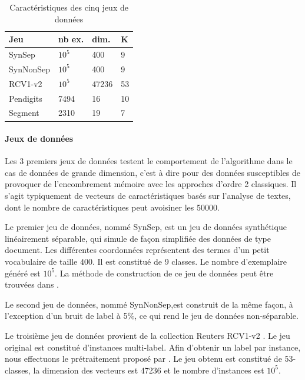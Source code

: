 \documentclass[twocolumn]{article}
\begin{document}
\begin{table}[h]
	\caption{Caractéristiques des cinq jeux de données}
	\label{table:mce}
	\begin{center}
		\begin{tabular}{l l l l}
			{\bf Jeu}  & {\bf nb ex.} & {\bf dim.} & {\bf K}\\
			\hline
			SynSep & $10^5$ 	& 400 	& 9 \\
			
			SynNonSep & $10^5$ & 400 	& 9 \\
			
			RCV1-v2  & $10^5$ 	& 47236 	& 53 \\
			
			Pendigits 	& 7494	& 16	& 10	\\
			
			Segment & 2310	& 19	& 7	\\
		\end{tabular}
	\end{center}
\end{table}

\paragraph{Jeux de données}
Les 3 premiers jeux de données testent le comportement de l'algorithme dans le cas de données de grande dimension, c'est à dire pour des données susceptibles de provoquer de l'encombrement mémoire avec les approches d'ordre 2 classiques. Il s'agit typiquement de vecteurs de caractéristiques basés sur l'analyse de textes, dont le nombre de caractéristiques peut avoisiner les 50000.
 
Le premier jeu de données, nommé SynSep, est un jeu de données synthétique linéairement séparable, qui simule de façon simplifiée des données de type document.  Les différentes coordonnées représentent des termes d'un petit vocabulaire de taille $400$. Il est constitué de 9 classes. Le nombre d'exemplaire généré est $10^5$.
La méthode de construction de ce jeu de données peut être trouvées dans \cite{kakade2008efficient}. 

Le second jeu de données, nommé SynNonSep,est construit de la même façon, à l'exception d'un bruit de label à 5\%, ce qui rend le jeu de données non-séparable. 

Le troisième jeu de données provient de la collection Reuters RCV1-v2 \cite{David04RCV}.
Le jeu original est constitué d'instances multi-label. Afin d'obtenir un label par instance, nous effectuons le prétraitement proposé par \cite{RB08a}. Le jeu obtenu est constitué de 53-classes, la dimension des vecteurs est 47236 et le nombre d'instances est $10^5$. 
\end{document}
